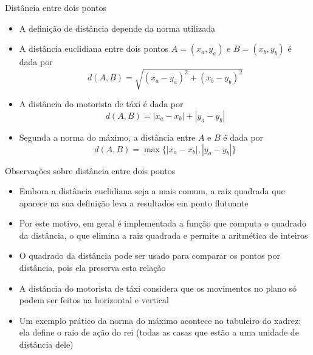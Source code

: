 \begin{frame}[fragile]{Distância entre dois pontos}

    \begin{itemize}
        \item A definição de distância depende da norma utilizada
        \pause

        \item A distância euclidiana entre dois pontos $A = (x_a, y_a)$ e $B = (x_b, y_b)$ é dada por
        \[
            d(A, B) = \sqrt{(x_a - y_a)^2 + (x_b - y_b)^2}
        \]
        \pause

        \item A distância do motorista de táxi é dada por
        \[
            d(A, B) = |x_a - x_b| + |y_a - y_b|
        \]
        \pause

        \item Segunda a norma do máximo, a distância entre $A$ e $B$ é dada por
        \[
            d(A, B) = \max\lbrace |x_a - x_b|, |y_a - y_b|\rbrace
        \]
    \end{itemize}

\end{frame}

\begin{frame}[fragile]{Observações sobre distância entre dois pontos}

    \begin{itemize}
        \item Embora a distância euclidiana seja a mais comum, a raiz quadrada que aparece na
            sua definição leva a resultados em ponto flutuante
        \pause

        \item Por este motivo, em geral é implementada a função que computa o quadrado da
            distância, o que elimina a raiz quadrada e permite a aritmética de inteiros
        \pause

        \item O quadrado da distância pode ser usado para comparar os pontos por distância, pois
            ela preserva esta relação
        \pause

        \item A distância do motorista de táxi considera que os movimentos no plano só podem ser
            feitos na horizontal e vertical
        \pause

        \item Um exemplo prático da norma do máximo acontece no tabuleiro do xadrez: ela define o
            raio de ação do rei (todas as casas que estão a uma unidade de distância dele)
    \end{itemize}

\end{frame}

